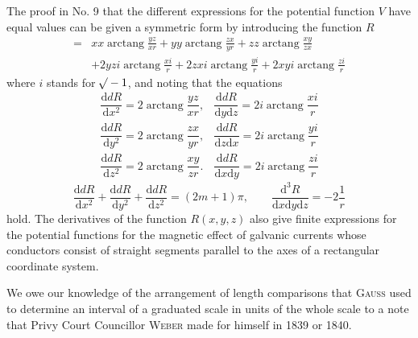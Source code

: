 The proof in No. 9 that the different expressions for the potential function $V$ have equal values can be given a symmetric form by introducing the function $R$
\[
\begin{aligned}
={}&xx\operatorname{arctang}\frac{yz}{xr}+yy\operatorname{arctang}\frac{zx}{yr}+zz\operatorname{arctang}\frac{xy}{zx}\\
&+2yzi\operatorname{arctang}\frac{xi}r+2zxi\operatorname{arctang}\frac{yi}r+2xyi\operatorname{arctang}\frac{zi}r
\end{aligned}
\]
where $i$ stands for $\mathord{{}^{}\!\surd}-1$, and noting that the equations
\[
\begin{array}{ll}
\dfrac{\mathrm ddR}{\mathrm dx^2}=2\operatorname{arctang}\dfrac{yz}{xr},&\dfrac{\mathrm ddR}{\mathrm dy\mathrm dz}=2i\operatorname{arctang}\dfrac{xi}r\\[5pt]
\dfrac{\mathrm ddR}{\mathrm dy^2}=2\operatorname{arctang}\dfrac{zx}{yr},&\dfrac{\mathrm ddR}{\mathrm dz\mathrm dx}=2i\operatorname{arctang}\dfrac{yi}r\\[5pt]
\dfrac{\mathrm ddR}{\mathrm dz^2}=2\operatorname{arctang}\dfrac{xy}{zr}.&\dfrac{\mathrm ddR}{\mathrm dx\mathrm dy}=2i\operatorname{arctang}\dfrac{zi}r
\end{array}
\]
\[
\frac{\mathrm ddR}{\mathrm dx^2}+\frac{\mathrm ddR}{\mathrm dy^2}+\frac{\mathrm ddR}{\mathrm dz^2}=(2m+1)\pi,\qquad\frac{\mathrm d^3R}{\mathrm dx\mathrm dy\mathrm dz}=-2\frac1r
\]
hold. The derivatives of the function $R(x,y,z)$ also give finite expressions for the potential functions for the magnetic effect of galvanic currents whose conductors consist of straight segments parallel to the axes of a rectangular coordinate system.

We owe our knowledge of the arrangement of length comparisons that \textsc{Gauss} used to determine an interval of a graduated scale in units of the whole scale to a note that Privy Court Councillor \textsc{Weber} made for himself in 1839 or 1840.

